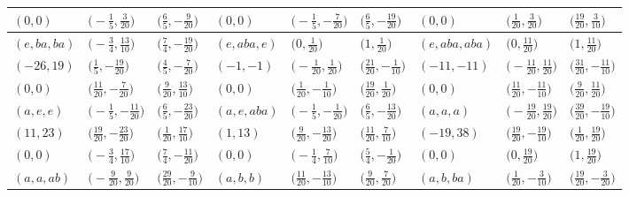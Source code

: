 \documentclass[10pt,a4paper]{amsart}
\theoremstyle{definition}
\numberwithin{equation}{section}
\begin{document}
\begin{landscape}
\begin{table}[th]
\begin{tabular}{|lll|lll|lll|}
\\
$(0, 0)$ & $\bigl(-\frac{1}{5}, \frac{3}{20}\bigr)$ & $\bigl(\frac{6}{5}, -\frac{9}{20}\bigr)$ & $(0, 0)$ & $\bigl(-\frac{1}{5}, -\frac{7}{20}\bigr)$ & $\bigl(\frac{6}{5}, -\frac{19}{20}\bigr)$ & $(0, 0)$ & $\bigl(\frac{1}{20}, \frac{3}{20}\bigr)$ & $\bigl(\frac{19}{20}, \frac{3}{10}\bigr)$
\\\hline
$(e, ba, ba)$ & $\bigl(-\frac{3}{4}, \frac{13}{10}\bigr)$ & $\bigl(\frac{7}{4}, -\frac{19}{20}\bigr)$ & $(e, aba, e)$ & $\bigl(0, \frac{1}{20}\bigr)$ & $\bigl(1, \frac{1}{20}\bigr)$ & $(e, aba, aba)$ & $\bigl(0, \frac{11}{20}\bigr)$ & $\bigl(1, \frac{11}{20}\bigr)$
\\
$(-26, 19)$ & $\bigl(\frac{1}{5}, -\frac{19}{20}\bigr)$ & $\bigl(\frac{4}{5}, -\frac{7}{20}\bigr)$ & $(-1, -1)$ & $\bigl(-\frac{1}{20}, \frac{1}{20}\bigr)$ & $\bigl(\frac{21}{20}, -\frac{1}{10}\bigr)$ & $(-11, -11)$ & $\bigl(-\frac{11}{20}, \frac{11}{20}\bigr)$ & $\bigl(\frac{31}{20}, -\frac{11}{10}\bigr)$
\\
$(0, 0)$ & $\bigl(\frac{11}{20}, -\frac{7}{20}\bigr)$ & $\bigl(\frac{9}{20}, \frac{13}{10}\bigr)$ & $(0, 0)$ & $\bigl(\frac{1}{20}, -\frac{1}{10}\bigr)$ & $\bigl(\frac{19}{20}, \frac{1}{20}\bigr)$ & $(0, 0)$ & $\bigl(\frac{11}{20}, -\frac{11}{10}\bigr)$ & $\bigl(\frac{9}{20}, \frac{11}{20}\bigr)$
\\\hline
$(a, e, e)$ & $\bigl(-\frac{1}{5}, -\frac{11}{20}\bigr)$ & $\bigl(\frac{6}{5}, -\frac{23}{20}\bigr)$ & $(a, e, aba)$ & $\bigl(-\frac{1}{5}, -\frac{1}{20}\bigr)$ & $\bigl(\frac{6}{5}, -\frac{13}{20}\bigr)$ & $(a, a, a)$ & $\bigl(-\frac{19}{20}, \frac{19}{20}\bigr)$ & $\bigl(\frac{39}{20}, -\frac{19}{10}\bigr)$
\\
$(11, 23)$ & $\bigl(\frac{19}{20}, -\frac{23}{20}\bigr)$ & $\bigl(\frac{1}{20}, \frac{17}{10}\bigr)$ & $(1, 13)$ & $\bigl(\frac{9}{20}, -\frac{13}{20}\bigr)$ & $\bigl(\frac{11}{20}, \frac{7}{10}\bigr)$ & $(-19, 38)$ & $\bigl(\frac{19}{20}, -\frac{19}{10}\bigr)$ & $\bigl(\frac{1}{20}, \frac{19}{20}\bigr)$
\\
$(0, 0)$ & $\bigl(-\frac{3}{4}, \frac{17}{10}\bigr)$ & $\bigl(\frac{7}{4}, -\frac{11}{20}\bigr)$ & $(0, 0)$ & $\bigl(-\frac{1}{4}, \frac{7}{10}\bigr)$ & $\bigl(\frac{5}{4}, -\frac{1}{20}\bigr)$ & $(0, 0)$ & $\bigl(0, \frac{19}{20}\bigr)$ & $\bigl(1, \frac{19}{20}\bigr)$
\\\hline
$(a, a, ab)$ & $\bigl(-\frac{9}{20}, \frac{9}{20}\bigr)$ & $\bigl(\frac{29}{20}, -\frac{9}{10}\bigr)$ & $(a, b, b)$ & $\bigl(\frac{11}{20}, -\frac{13}{10}\bigr)$ & $\bigl(\frac{9}{20}, \frac{7}{20}\bigr)$ & $(a, b, ba)$ & $\bigl(\frac{1}{20}, -\frac{3}{10}\bigr)$ & $\bigl(\frac{19}{20}, -\frac{3}{20}\bigr)$

\end{tabular}
\end{table}
\end{landscape}
\end{document}
